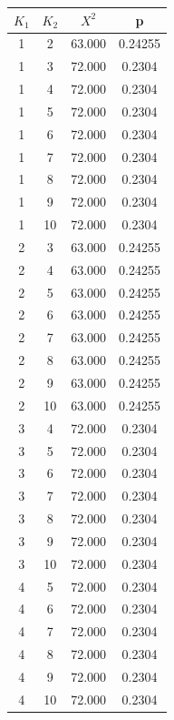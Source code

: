 \begin{table}

\begin{subtable}[tbp]{0.4\textwidth}
\centering
 
\begin{tabular}{|c|c|c|c|}\hline
 $K_1$ & $K_2$ & $X^2$ & p\\ \hline
 1 & 2 & 63.000 & 0.24255\\ \hline 
 1 & 3 & 72.000 & 0.2304\\ \hline 
 1 & 4 & 72.000 & 0.2304\\ \hline 
 1 & 5 & 72.000 & 0.2304\\ \hline 
 1 & 6 & 72.000 & 0.2304\\ \hline 
 1 & 7 & 72.000 & 0.2304\\ \hline 
 1 & 8 & 72.000 & 0.2304\\ \hline 
 1 & 9 & 72.000 & 0.2304\\ \hline 
 1 & 10 & 72.000 & 0.2304\\ \hline 
 2 & 3 & 63.000 & 0.24255\\ \hline 
 2 & 4 & 63.000 & 0.24255\\ \hline 
 2 & 5 & 63.000 & 0.24255\\ \hline 
 2 & 6 & 63.000 & 0.24255\\ \hline 
 2 & 7 & 63.000 & 0.24255\\ \hline 
 2 & 8 & 63.000 & 0.24255\\ \hline 
 2 & 9 & 63.000 & 0.24255\\ \hline 
 2 & 10 & 63.000 & 0.24255\\ \hline 
 3 & 4 & 72.000 & 0.2304\\ \hline 
 3 & 5 & 72.000 & 0.2304\\ \hline 
 3 & 6 & 72.000 & 0.2304\\ \hline 
 3 & 7 & 72.000 & 0.2304\\ \hline 
 3 & 8 & 72.000 & 0.2304\\ \hline 
 3 & 9 & 72.000 & 0.2304\\ \hline 
 3 & 10 & 72.000 & 0.2304\\ \hline 
 4 & 5 & 72.000 & 0.2304\\ \hline 
 4 & 6 & 72.000 & 0.2304\\ \hline 
 4 & 7 & 72.000 & 0.2304\\ \hline 
 4 & 8 & 72.000 & 0.2304\\ \hline 
 4 & 9 & 72.000 & 0.2304\\ \hline 
 4 & 10 & 72.000 & 0.2304\\ \hline 

\end{tabular}
\end{subtable}
\end{table}
